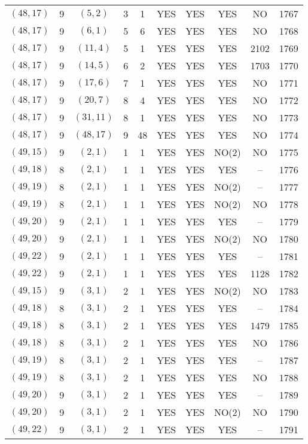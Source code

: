 \begin{longtable}{|c|c|c|c|c|c|c|c|c|c|}
$(48, 17)$ & 9 & $(5, 2)$ & 3 & 1 & YES & YES & YES & NO & 1767\\
$(48, 17)$ & 9 & $(6, 1)$ & 5 & 6 & YES & YES & YES & NO & 1768\\
$(48, 17)$ & 9 & $(11, 4)$ & 5 & 1 & YES & YES & YES & 2102 & 1769\\
$(48, 17)$ & 9 & $(14, 5)$ & 6 & 2 & YES & YES & YES & 1703 & 1770\\
$(48, 17)$ & 9 & $(17, 6)$ & 7 & 1 & YES & YES & YES & NO & 1771\\
$(48, 17)$ & 9 & $(20, 7)$ & 8 & 4 & YES & YES & YES & NO & 1772\\
$(48, 17)$ & 9 & $(31, 11)$ & 8 & 1 & YES & YES & YES & NO & 1773\\
$(48, 17)$ & 9 & $(48, 17)$ & 9 & 48 & YES & YES & YES & NO & 1774\\
$(49, 15)$ & 9 & $(2, 1)$ & 1 & 1 & YES & YES & NO(2) & NO & 1775\\
$(49, 18)$ & 8 & $(2, 1)$ & 1 & 1 & YES & YES & YES & -- & 1776\\
$(49, 19)$ & 8 & $(2, 1)$ & 1 & 1 & YES & YES & NO(2) & -- & 1777\\
$(49, 19)$ & 8 & $(2, 1)$ & 1 & 1 & YES & YES & NO(2) & NO & 1778\\
$(49, 20)$ & 9 & $(2, 1)$ & 1 & 1 & YES & YES & YES & -- & 1779\\
$(49, 20)$ & 9 & $(2, 1)$ & 1 & 1 & YES & YES & NO(2) & NO & 1780\\
$(49, 22)$ & 9 & $(2, 1)$ & 1 & 1 & YES & YES & YES & -- & 1781\\
$(49, 22)$ & 9 & $(2, 1)$ & 1 & 1 & YES & YES & YES & 1128 & 1782\\
$(49, 15)$ & 9 & $(3, 1)$ & 2 & 1 & YES & YES & NO(2) & NO & 1783\\
$(49, 18)$ & 8 & $(3, 1)$ & 2 & 1 & YES & YES & YES & -- & 1784\\
$(49, 18)$ & 8 & $(3, 1)$ & 2 & 1 & YES & YES & YES & 1479 & 1785\\
$(49, 18)$ & 8 & $(3, 1)$ & 2 & 1 & YES & YES & YES & NO & 1786\\
$(49, 19)$ & 8 & $(3, 1)$ & 2 & 1 & YES & YES & YES & -- & 1787\\
$(49, 19)$ & 8 & $(3, 1)$ & 2 & 1 & YES & YES & YES & NO & 1788\\
$(49, 20)$ & 9 & $(3, 1)$ & 2 & 1 & YES & YES & YES & -- & 1789\\
$(49, 20)$ & 9 & $(3, 1)$ & 2 & 1 & YES & YES & NO(2) & NO & 1790\\
$(49, 22)$ & 9 & $(3, 1)$ & 2 & 1 & YES & YES & YES & -- & 1791\\

\end{longtable}
